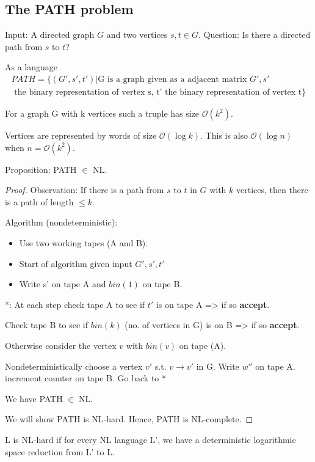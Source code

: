 \documentclass[a4paper,12pt]{article}
\theoremstyle{definition}
\theoremstyle{remark}
\begin{document}
\subsection{The PATH problem}
Input: A directed graph $G$ and two vertices $s, t \in G$.
Question: Is there a directed path from $s$ to $t$?

As a language
\begin{gather*}
    PATH = \{(G', s', t') | \text{G is a graph given as a adjacent matrix } G', s' \\
    \text{ the binary representation of vertex s, t' the binary representation of vertex t}\}
\end{gather*}

For a graph G with k vertices such a truple has size $\mathscr{O}(k^2)$.

Vertices are represented by words of size $\mathscr{O}(\log k)$. This is also $\mathscr{O}(\log n)$ when $n = \mathscr{O}(k^2)$.

Proposition: PATH $\in$ NL.

\begin{proof}
    Observation: If there is a path from $s$ to $t$ in $G$ with $k$ vertices, then there is a path of length $ \leq k$.

    Algorithm (nondeterministic):
    \begin{itemize}
        \item Use two working tapes (A and B).
        \item Start of algorithm given input $G', s', t'$ 
        \item Write s' on tape A and $bin(1)$ on tape B.
    \end{itemize}

    *: At each step check tape A to see if $t'$ is on tape A => if so \textbf{accept}.

    Check tape B to see if $bin(k)$ (no. of vertices in G) is on B => if so \textbf{accept}.

    Otherwise consider the vertex $v$ with $bin(v)$ on tape (A).

    Nondeterministically choose a vertex $v'$ s.t. $v \to v'$ in G. Write $w''$ on tape A. increment counter on tape B. Go back to *

    We have PATH $\in$ NL.

    We will show PATH is NL-hard. Hence, PATH is NL-complete.
\end{proof}

L is NL-hard if for every NL language L', we have a deterministic logarithmic space reduction from L' to L.
\end{document}
